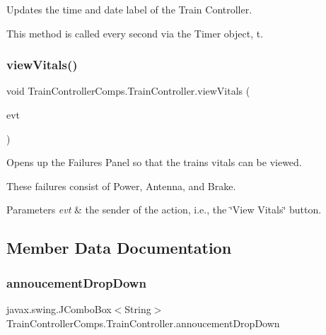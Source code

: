 Updates the time and date label of the Train Controller. 

This method is called every second via the Timer object, t. \mbox{\label{classTrainControllerComps_1_1TrainController_ac82b3d9b38e4f9401242eace87b56d97}} 
\subsubsection{\texorpdfstring{view\+Vitals()}{viewVitals()}}
{\footnotesize\ttfamily void Train\+Controller\+Comps.\+Train\+Controller.\+view\+Vitals (\begin{DoxyParamCaption}\item[{java.\+awt.\+event.\+Action\+Event}]{evt }\end{DoxyParamCaption})\hspace{0.3cm}{\ttfamily [private]}}



Opens up the Failures Panel so that the train\textquotesingle{}s vitals can be viewed. 

These failures consist of Power, Antenna, and Brake.


\begin{DoxyParams}{Parameters}
{\em evt} & the sender of the action, i.\+e., the \char`\"{}\+View Vitals\char`\"{} button. \\
\hline
\end{DoxyParams}


\subsection{Member Data Documentation}
\mbox{\label{classTrainControllerComps_1_1TrainController_a06551cd4e6a89d9212acf3c76ea2cd42}} 
\subsubsection{\texorpdfstring{annoucement\+Drop\+Down}{annoucementDropDown}}
{\footnotesize\ttfamily javax.\+swing.\+J\+Combo\+Box$<$String$>$ Train\+Controller\+Comps.\+Train\+Controller.\+annoucement\+Drop\+Down\hspace{0.3cm}{\ttfamily [private]}}

